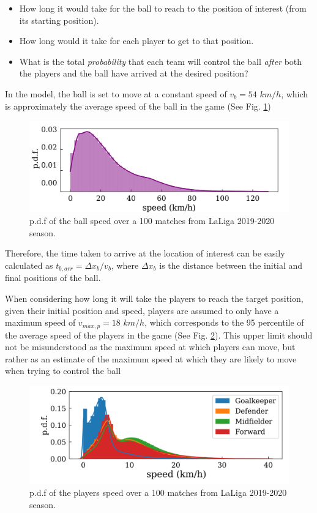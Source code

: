 \documentclass[
  twoside,nohyper]{book}
\providecommand{\tightlist}{%
  \setlength{\itemsep}{0pt}\setlength{\parskip}{0pt}}
\begin{document}
\begin{itemize}
\tightlist
\item
  How long it would take for the ball to reach to the position of interest (from its starting position).
\item
  How long would it take for each player to get to that position.
\item
  What is the total \emph{probability} that each team will control the ball \emph{after} both the players and the ball have arrived at the desired position?
\end{itemize}

In the model, the ball is set to move at a constant speed of \(v_b = 54\) \(km/h\), which is approximately the average speed of the ball in the game (See Fig. \ref{fig:ball})

\begin{figure}[H]

{\centering \includegraphics[width=0.8\linewidth,]{imagenes/ball} 

}

\caption{p.d.f of the ball speed over a 100 matches from LaLiga 2019-2020 season.}\label{fig:ball}
\end{figure}

Therefore, the time taken to arrive at the location of interest can be easily calculated as \(t_{b,arr} = \Delta x_b/v_b\), where \(\Delta x_b\) is the distance between the initial and final positions of the ball.

When considering how long it will take the players to reach the target position, given their initial position and speed, players are assumed to only have a maximum speed of \(v_{max,p} = 18\) \(km/h\), which corresponds to the 95 percentile of the average speed of the players in the game (See Fig. \ref{fig:vel}). This upper limit should not be misunderstood as the maximum speed at which players can move, but rather as an estimate of the maximum speed at which they are likely to move when trying to control the ball

\begin{figure}[H]

{\centering \includegraphics[width=0.8\linewidth,]{imagenes/vel} 

}

\caption{p.d.f of the players speed over a 100 matches from LaLiga 2019-2020 season.}\label{fig:vel}
\end{figure}
\end{document}
